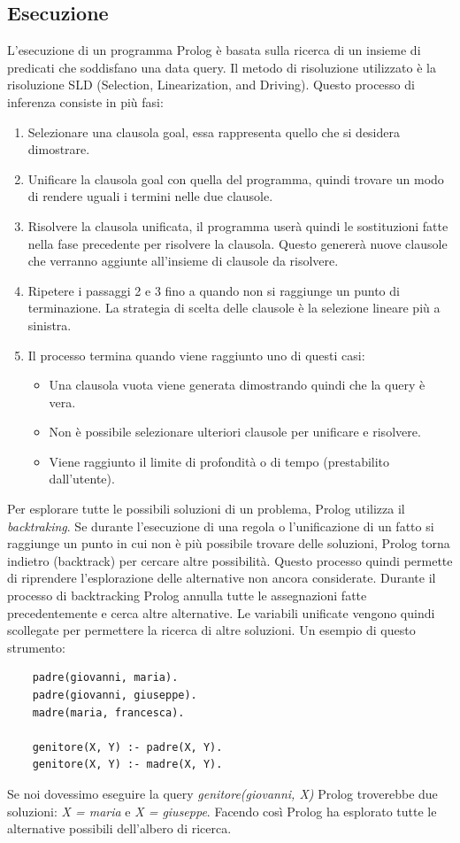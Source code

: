 \subsection{Esecuzione}
\label{subsec:esecuzione}
L'esecuzione di un programma Prolog è basata sulla ricerca di un insieme di predicati che soddisfano una data query. Il metodo di risoluzione utilizzato è la risoluzione SLD \cite{kowalski1974predicate} (Selection, Linearization, and Driving).
Questo processo di inferenza consiste in più fasi:
\begin{enumerate}
    \item Selezionare una clausola goal, essa rappresenta quello che si desidera dimostrare.
    \item Unificare la clausola goal con quella del programma, quindi trovare un modo di rendere uguali i termini nelle due clausole.
    \item Risolvere la clausola unificata, il programma userà quindi le sostituzioni fatte nella fase precedente per risolvere la clausola. Questo genererà nuove clausole che verranno aggiunte all'insieme di clausole da risolvere.
    \item Ripetere i passaggi 2 e 3 fino a quando non si raggiunge un punto di terminazione. La strategia di scelta delle clausole  è la selezione lineare più a sinistra.
    \item Il processo termina quando viene raggiunto uno di questi casi:
          \begin{itemize}
              \item Una clausola vuota viene generata dimostrando quindi che la query è vera.
              \item Non è possibile selezionare ulteriori clausole per unificare e risolvere.
              \item Viene raggiunto il limite di profondità o di tempo (prestabilito dall'utente).
          \end{itemize}
\end{enumerate}
Per esplorare tutte le possibili soluzioni di un problema, Prolog utilizza il \textit{backtraking}. Se durante l'esecuzione di una
regola o l'unificazione di un fatto si raggiunge un punto in cui non è più possibile trovare delle soluzioni, Prolog torna indietro (backtrack)
per cercare altre possibilità. Questo processo quindi permette di riprendere l'esplorazione delle alternative non ancora considerate.
Durante il processo di backtracking Prolog annulla tutte le assegnazioni fatte precedentemente e cerca altre alternative. Le variabili unificate vengono quindi scollegate
per permettere la ricerca di altre soluzioni. Un esempio di questo strumento:
\begin{lstlisting}
    padre(giovanni, maria).
    padre(giovanni, giuseppe).
    madre(maria, francesca).

    genitore(X, Y) :- padre(X, Y).
    genitore(X, Y) :- madre(X, Y).
\end{lstlisting}
Se noi dovessimo eseguire la query \textit{genitore(giovanni, X)} Prolog troverebbe due soluzioni: \textit{X = maria} e \textit{X = giuseppe}.
Facendo così Prolog ha esplorato tutte le alternative possibili dell'albero di ricerca.
